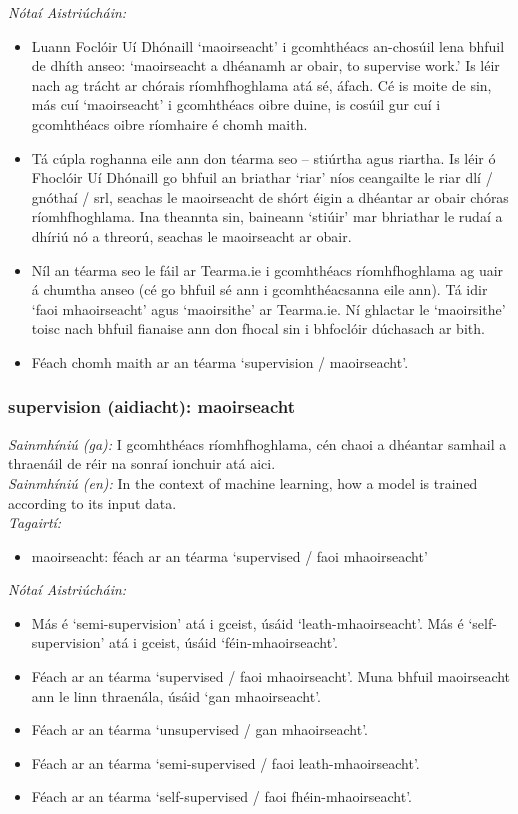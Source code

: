  \noindent \textit{Nótaí Aistriúcháin:}
\begin{itemize}
	\item Luann Foclóir Uí Dhónaill `maoirseacht' i gcomhthéacs an-chosúil lena bhfuil de dhíth anseo: `maoirseacht a dhéanamh ar obair, to supervise work.' Is léir nach ag trácht ar chórais ríomhfhoghlama atá sé, áfach. Cé is moite de sin, más cuí `maoirseacht' i gcomhthéacs oibre duine, is cosúil gur cuí i gcomhthéacs oibre ríomhaire é chomh maith.
	\item Tá cúpla roghanna eile ann don téarma seo -- stiúrtha agus riartha. Is léir ó Fhoclóir Uí Dhónaill go bhfuil an briathar `riar' níos ceangailte le riar dlí / gnóthaí / srl, seachas le maoirseacht de shórt éigin a dhéantar ar obair chóras ríomhfhoghlama. Ina theannta sin, baineann `stiúir' mar bhriathar le rudaí a dhíriú nó a threorú, seachas le maoirseacht ar obair.
	\item Níl an téarma seo le fáil ar Tearma.ie i gcomhthéacs ríomhfhoghlama ag uair á chumtha anseo (cé go bhfuil sé ann i gcomhthéacsanna eile ann). Tá idir `faoi mhaoirseacht' agus `maoirsithe' ar Tearma.ie. Ní ghlactar le `maoirsithe' toisc nach bhfuil fianaise ann don fhocal sin i bhfoclóir dúchasach ar bith.
	\item Féach chomh maith ar an téarma `supervision / maoirseacht'.
\end{itemize}


\subsubsection*{supervision (aidiacht): maoirseacht}
 \noindent \textit{Sainmhíniú (ga):} I gcomhthéacs ríomhfhoghlama, cén chaoi a dhéantar samhail a thraenáil de réir na sonraí ionchuir atá aici.
\\
 \noindent \textit{Sainmhíniú (en):} In the context of machine learning, how a model is trained according to its input data.
\\
 \noindent \textit{Tagairtí:}
\begin{itemize}
	\item maoirseacht: féach ar an téarma `supervised / faoi mhaoirseacht'
\end{itemize}

 \noindent \textit{Nótaí Aistriúcháin:}
\begin{itemize}
	\item Más é `semi-supervision' atá i gceist, úsáid `leath-mhaoirseacht'. Más é `self-supervision' atá i gceist, úsáid `féin-mhaoirseacht'.
	\item Féach ar an téarma `supervised / faoi mhaoirseacht'. Muna bhfuil maoirseacht ann le linn thraenála, úsáid `gan mhaoirseacht'.
	\item Féach ar an téarma `unsupervised / gan mhaoirseacht'.
	\item Féach ar an téarma `semi-supervised / faoi leath-mhaoirseacht'.
	\item Féach ar an téarma `self-supervised / faoi fhéin-mhaoirseacht'.
\end{itemize}


